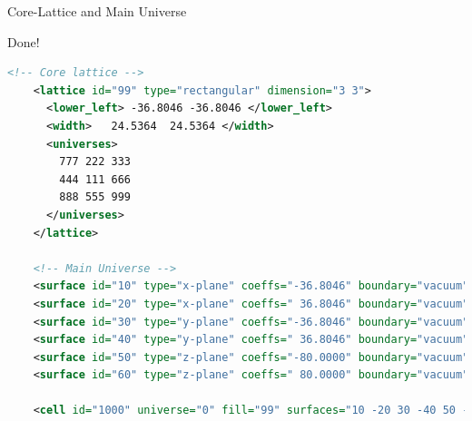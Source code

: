 \begin{frame}[fragile]{Core-Lattice and Main Universe}

  \centering

  Done!

  \begin{scriptsize}
    \begin{lstlisting}[language=XML,gobble=4]
    <!-- Core lattice -->
    <lattice id="99" type="rectangular" dimension="3 3">
      <lower_left> -36.8046 -36.8046 </lower_left>
      <width>   24.5364  24.5364 </width>
      <universes>
        777 222 333
        444 111 666
        888 555 999
      </universes>
    </lattice>
    
    <!-- Main Universe -->
    <surface id="10" type="x-plane" coeffs="-36.8046" boundary="vacuum"/>
    <surface id="20" type="x-plane" coeffs=" 36.8046" boundary="vacuum"/>
    <surface id="30" type="y-plane" coeffs="-36.8046" boundary="vacuum"/>
    <surface id="40" type="y-plane" coeffs=" 36.8046" boundary="vacuum"/>
    <surface id="50" type="z-plane" coeffs="-80.0000" boundary="vacuum"/>
    <surface id="60" type="z-plane" coeffs=" 80.0000" boundary="vacuum"/>
    
    <cell id="1000" universe="0" fill="99" surfaces="10 -20 30 -40 50 -60"/>
    
    \end{lstlisting}
  \end{scriptsize}
  
\end{frame}

